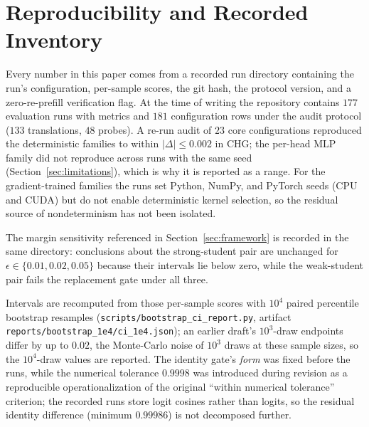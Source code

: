 \documentclass[10pt]{article}
\begin{document}
\section{Reproducibility and Recorded Inventory}
\label{app:repro}

Every number in this paper comes from a recorded run directory containing the
run's configuration, per-sample scores, the git hash, the protocol version, and
a zero-re-prefill verification flag. At the time of writing the repository
contains $177$ evaluation runs with metrics and $181$ configuration rows under
the audit protocol ($133$ translations, $48$ probes). A re-run audit of $23$
core configurations reproduced the deterministic families to within $|\Delta|
\le 0.002$ in CHG; the per-head MLP family did not reproduce across runs with
the same seed (Section~\ref{sec:limitations}), which is why it is reported as a
range. For the gradient-trained families the runs set Python, NumPy, and PyTorch
seeds (CPU and CUDA) but do not enable deterministic kernel selection, so the
residual source of nondeterminism has not been isolated.

The margin sensitivity referenced in Section~\ref{sec:framework} is recorded in
the same directory: conclusions about the strong-student pair are unchanged for
$\epsilon\in\{0.01,0.02,0.05\}$ because their intervals lie below zero, while
the weak-student pair fails the replacement gate under all three.

Intervals are recomputed from those per-sample scores with $10^4$ paired
percentile bootstrap resamples (\texttt{scripts/bootstrap\_ci\_report.py},
artifact \texttt{reports/bootstrap\_1e4/ci\_1e4.json}); an earlier draft's
$10^3$-draw endpoints differ by up to $0.02$, the Monte-Carlo noise of $10^3$
draws at these sample sizes, so the $10^4$-draw values are reported.
The identity gate's \emph{form} was fixed before the runs, while the numerical
tolerance $0.9998$ was introduced during revision as a reproducible
operationalization of the original ``within numerical tolerance'' criterion;
the recorded runs store logit cosines rather than logits, so the residual
identity difference (minimum $0.99986$) is not decomposed further.
\end{document}
